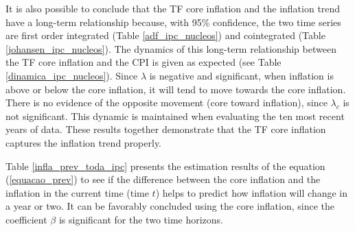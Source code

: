 \documentclass[10pt]{article}
\begin{document}
\vspace{0.3cm}


It is also possible to conclude that the TF core inflation and the inflation trend have a long-term relationship because, with 95\% confidence, the two time series are  first order integrated (Table \ref{adf_ipc_nucleos}) and cointegrated (Table \ref{johansen_ipc_nucleos}). The dynamics of this long-term relationship between the TF core inflation and the CPI is given as expected (see Table \ref{dinamica_ipc_nucleos}). Since $\lambda$ is negative and significant, when inflation is above or below the core inflation, it will tend to move towards the core inflation. There is no evidence of the opposite movement (core toward inflation), since $\lambda_c$  is not significant. This dynamic is maintained when evaluating the ten most recent years of data. These results together demonstrate that the TF core inflation captures the inflation trend properly.



Table \ref{infla_prev_toda_ipc} presents the estimation results of the equation (\ref{equacao_prev}) to see if the difference between the core inflation and the inflation in the current time (time $t$) helps to predict how inflation will change in a year or two. It can be favorably concluded using the core inflation, since the coefficient $\beta$  is significant for the two time horizons.

\end{document}
